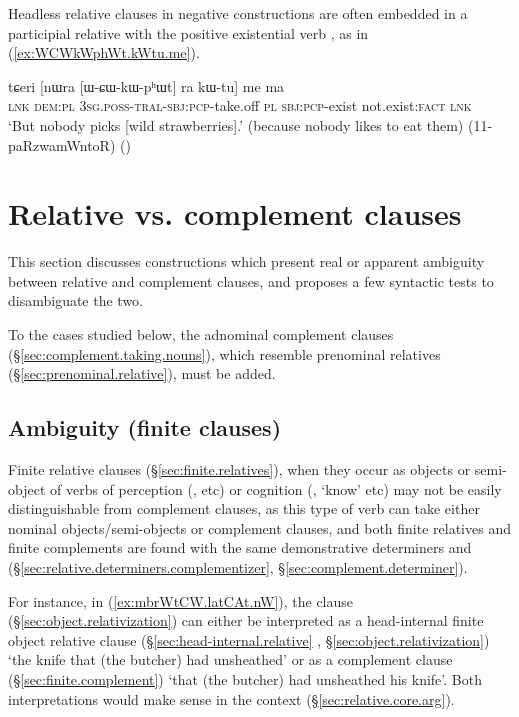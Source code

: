Headless relative clauses in negative constructions are often embedded in a participial relative with the positive existential verb , as in (\ref{ex:WCWkWphWt.kWtu.me}).

\begin{exe}
\ex \label{ex:WCWkWphWt.kWtu.me}
\gll tɕeri [nɯra [ɯ-ɕɯ-kɯ-pʰɯt] ra kɯ-tu] me ma \\
\textsc{lnk} \textsc{dem}:\textsc{pl} \textsc{3sg}.\textsc{poss}-\textsc{tral}-\textsc{sbj}:\textsc{pcp}-take.off \textsc{pl} \textsc{sbj}:\textsc{pcp}-exist not.exist:\textsc{fact} \textsc{lnk} \\
\glt `But nobody picks [wild strawberries].' (because nobody likes to eat them) (11-paRzwamWntoR)
()
\end{exe}

 
\section{Relative vs. complement clauses}  \label{sec:relative.complement.ambiguities}
This section discusses constructions which present real or apparent ambiguity between relative and complement clauses, and proposes a few syntactic tests to disambiguate the two.

To the cases studied below, the adnominal complement clauses (§\ref{sec:complement.taking.nouns}), which resemble prenominal relatives (§\ref{sec:prenominal.relative}), must be added.


\subsection{Ambiguity (finite clauses)} \label{sec:finite.relative.complement.ambiguity}
Finite relative clauses (§\ref{sec:finite.relatives}), when they occur as objects or semi-object of verbs of perception (,  etc) or cognition (, `know' etc) may not be easily distinguishable from complement clauses, as this type of verb can take either nominal objects/semi-objects or complement clauses, and both finite relatives and finite complements are found with the same demonstrative determiners  and  (§\ref{sec:relative.determiners.complementizer}, §\ref{sec:complement.determiner}).

For instance, in (\ref{ex:mbrWtCW.latCAt.nW}), the clause  (§\ref{sec:object.relativization}) can either be interpreted as a head-internal finite object relative clause (§\ref{sec:head-internal.relative} , §\ref{sec:object.relativization}) `the knife that (the butcher) had unsheathed' or as a complement clause (§\ref{sec:finite.complement}) `that (the butcher) had unsheathed his knife'. Both interpretations would make sense in the context (§\ref{sec:relative.core.arg}).

